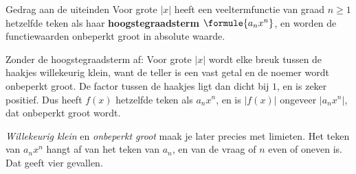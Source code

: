 \begin{theorie}
\begin{stelling}{Gedrag aan de uiteinden}
Voor grote $|x|$ heeft een veeltermfunctie van graad $n \geqslant 1$ hetzelfde teken als haar \textbf{\textcolor{accent}{hoogstegraadsterm}} $\formule{a_n x^n}$, en worden de functiewaarden onbeperkt groot in absolute waarde.
\end{stelling}

\begin{bewijs}
Zonder de hoogstegraadsterm af:
Voor grote $|x|$ wordt elke breuk tussen de haakjes willekeurig klein, want de teller is een vast getal en de noemer wordt onbeperkt groot. De factor tussen de haakjes ligt dan dicht bij $1$, en is zeker positief. Dus heeft $f(x)$ hetzelfde teken als $a_n x^n$, en is $|f(x)|$ ongeveer $|a_n x^n|$, dat onbeperkt groot wordt.
\end{bewijs}
\end{theorie}

\textit{Willekeurig klein} en \textit{onbeperkt groot} maak je later precies met limieten. Het teken van $a_n x^n$ hangt af van het teken van $a_n$, en van de vraag of $n$ even of oneven is. Dat geeft vier gevallen.

